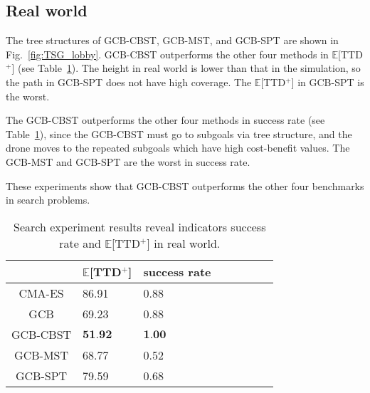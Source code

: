 \subsection{Real world}
The tree structures of GCB-CBST, GCB-MST, and GCB-SPT are shown in Fig.~\ref{fig:TSG_lobby}.
GCB-CBST outperforms the other four methods in $\mathbb{E}$[TTD$^+$] (see Table~\ref{tab:ETTD_lobby}).
The height in real world is lower than that in the simulation,
so the path in GCB-SPT does not have high coverage.
The $\mathbb{E}$[TTD$^+$] in GCB-SPT is the worst.

The GCB-CBST outperforms the other four methods in success rate (see Table~\ref{tab:ETTD_lobby}),
since the GCB-CBST must go to subgoals via tree structure, and the drone moves to the repeated subgoals which have high cost-benefit values.
The GCB-MST and GCB-SPT are the worst in success rate.

These experiments show that GCB-CBST outperforms the other four benchmarks in search problems.

\begin{table}[htbp]
   \caption{Search experiment results reveal indicators success rate and $\mathbb{E}$[TTD$^+$] in real world. }
   \begin{center}
     \begin{tabular}{| c | l | l | l | l | l |  l | l |} \hline
        & $\mathbb{E}$[TTD$^+$] & success rate\\ \hline\hline
      CMA-ES  & 86.91 & 0.88\\ \hline
      GCB     & 69.23  & 0.88\\ \hline
      GCB-CBST& $\textbf{51.92}$ & $\textbf{1.00}$\\ \hline
      GCB-MST & 68.77  & 0.52\\ \hline
      GCB-SPT & 79.59  & 0.68\\ \hline
    \end{tabular}
   \end{center}
   \label{tab:ETTD_lobby}
\end{table}

